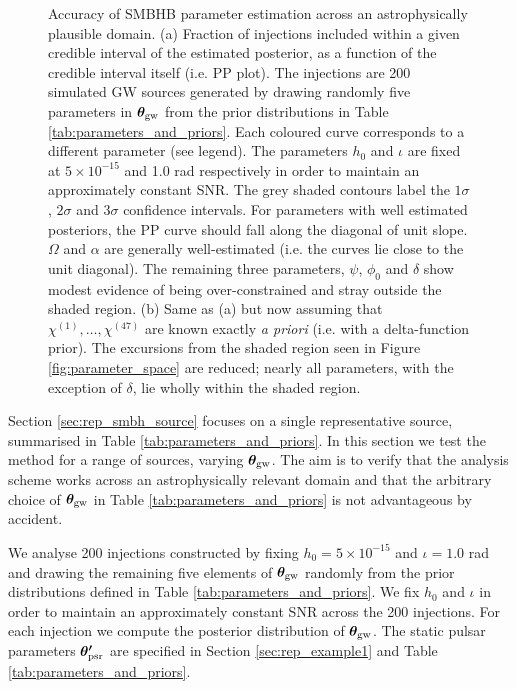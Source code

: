 \documentclass[fleqn,usenatbib,useAMS]{mnras}
\begin{document}
\begin{figure}
	\caption{Accuracy of SMBHB parameter estimation across an astrophysically plausible domain. (a) Fraction of injections included within a given credible interval of the estimated posterior, as a function of the credible interval itself (i.e. PP plot). The injections are 200 simulated GW sources generated by drawing randomly five parameters in $\boldsymbol{\theta}_{\rm gw}$ from the prior distributions in Table \ref{tab:parameters_and_priors}. Each coloured curve corresponds to a different parameter (see legend). The parameters $h_0$ and $\iota$ are fixed at $5 \times 10^{-15}$ and 1.0 rad respectively in order to maintain an approximately constant SNR. The grey shaded contours label the $1\sigma$, $2\sigma$ and 3$\sigma$ confidence intervals. For parameters with well estimated posteriors, the PP curve should fall along the diagonal of unit slope. $\Omega$ and $\alpha$ are generally well-estimated (i.e. the curves lie close to the unit diagonal). The remaining three parameters, $\psi$, $\phi_0$ and $\delta$ show modest evidence of being over-constrained and stray outside the shaded region. (b) Same as (a) but now assuming that $\chi^{(1)}, \dots, \chi^{(47)}$ are known exactly \textit{a priori} (i.e. with a delta-function prior). The excursions from the shaded region seen in Figure  \ref{fig:parameter_space} are reduced; nearly all parameters, with the exception of $\delta$, lie wholly within the shaded region. } \label{fig:AB}
\end{figure}


Section \ref{sec:rep_smbh_source} focuses on a single representative source, summarised in Table \ref{tab:parameters_and_priors}. In this section we test the method for a range of sources, varying $\boldsymbol{\theta}_{\rm gw}$. The aim is to verify that the analysis scheme works across an astrophysically relevant domain and that the arbitrary choice of $\boldsymbol{\theta}_{\rm gw}$ in Table \ref{tab:parameters_and_priors} is not advantageous by accident. \newline 

We analyse 200 injections constructed by fixing $h_0 = 5 \times 10^{-15}$ and $\iota =1.0$ rad and drawing the remaining five elements of $\boldsymbol{\theta}_{\rm gw}$ randomly from the prior distributions defined in Table \ref{tab:parameters_and_priors}. We fix $h_0$ and $\iota$ in order to maintain an approximately constant SNR across the 200 injections. For each injection we compute the posterior distribution of ${\boldsymbol{\theta}}_{\rm gw}$. The static pulsar parameters $\boldsymbol{\theta'}_{\rm psr}$ are specified in Section \ref{sec:rep_example1} and Table \ref{tab:parameters_and_priors}. \newline 
\end{document}

